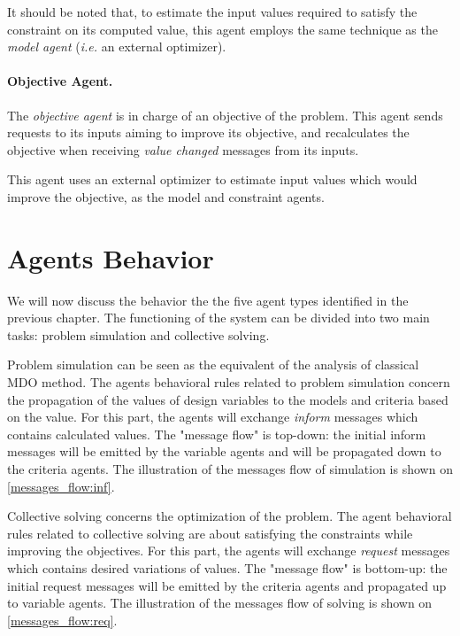 It should be noted that, to estimate the input values required to satisfy the constraint on its computed value, this agent employs the same technique as the \emph{model agent} (\textit{i.e.} an external optimizer).

\subsubsection*{Objective Agent.}
The  \emph{objective agent} is in charge of an objective of the problem. This agent sends requests to its inputs aiming to improve its objective, and recalculates the objective when receiving  \emph{value changed} messages from its inputs.

This agent uses an external optimizer to estimate input values which would improve the objective, as the model and constraint agents.


\chapter{Agents Behavior}

We will now discuss the behavior the the five agent types identified in the previous chapter. The functioning of the system can be divided into two main tasks: problem simulation and collective solving.

Problem simulation can be seen as the equivalent of the analysis of classical MDO method. The agents behavioral rules related to problem simulation concern the propagation of the values of design variables to the models and criteria based on the value. For this part, the agents will exchange \emph{inform} messages which contains calculated values. The "message flow" is top-down: the initial inform messages will be emitted by the variable agents and will be propagated down to the criteria agents. The illustration of the messages flow of simulation is shown on \figurename{} \ref{messages_flow:inf}.

Collective solving concerns the optimization of the problem. The agent behavioral rules related to collective solving are about satisfying the constraints while improving the objectives. For this part, the agents will exchange \emph{request} messages which contains desired variations of values. The "message flow" is bottom-up: the initial request messages will be emitted by the criteria agents and propagated up to variable agents. The illustration of the messages flow of solving is shown on \figurename{} \ref{messages_flow:req}.

